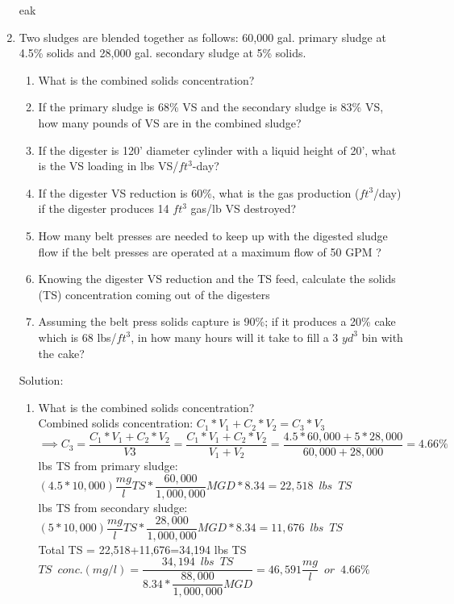 \documentclass{article}
\begin{document}
\begin{enumerate}
eak
\item Two sludges are blended together as follows: 60,000 gal. primary sludge at 4.5\% solids and 28,000 gal. secondary sludge at 5\% solids. 
\begin{enumerate}
\item What is the combined solids concentration? 
\item If the primary sludge is 68\% VS and the secondary sludge is 83\% VS, how many pounds of VS are in the combined sludge? 
\item If the digester is 120’ diameter cylinder with a liquid height of 20’, what is the VS loading in lbs VS/$ft^3$-day?
\item If the digester VS reduction is 60\%, what is the gas production ($ft^3$/day) if the digester produces 14 $ft^3$ gas/lb VS destroyed?
\item How many belt presses are needed to keep up with the digested sludge flow if the belt presses are operated at a maximum flow of 50 GPM ?
\item Knowing the digester VS reduction and the TS feed, calculate the solids (TS) concentration coming out of the digesters
\item Assuming the belt press solids capture is 90\%; if it produces a 20\% cake which is 68 lbs/$ft^3$, in how many hours will it take to fill a 3 $yd^3$ bin with the cake?
\end{enumerate}
Solution:\\
\begin{enumerate}
\item What is the combined solids concentration?\\
Combined solids concentration:
$
C_1*V_1 + C_2*V_2 = C_3*V_3$\\
$\implies C_3 = \dfrac{C_1*V_1 + C_2*V_2}{V3}=\dfrac{C_1*V_1 + C_2*V_2}{V_1 + V_2}=\dfrac{4.5*60,000 + 5*28,000}{60,000 + 28,000}=\boxed{4.66\%}
$\\

lbs TS from primary sludge: $(4.5*10,000)\dfrac{mg}{l}TS*\dfrac{60,000}{1,000,000}MGD*8.34=22,518 \enspace lbs \enspace TS$\\
lbs TS from secondary sludge: $(5*10,000)\dfrac{mg}{l}TS*\dfrac{28,000}{1,000,000}MGD*8.34=11,676 \enspace lbs \enspace TS$\\
Total TS = 22,518+11,676=34,194 lbs TS\\
$TS \enspace conc.(mg/l) = \dfrac{34,194 \enspace lbs \enspace TS}{8.34*\dfrac{88,000}{1,000,000}MGD}=\boxed{46,591\dfrac{mg}{l} \enspace or \enspace 4.66\%}$


\end{enumerate}
\end{enumerate}
\end{document}
